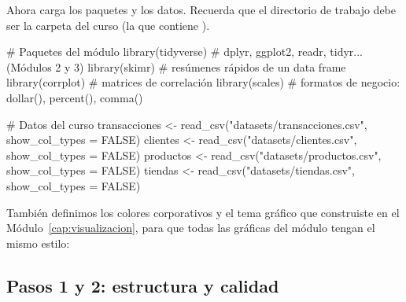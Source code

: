 Ahora carga los paquetes y los datos. Recuerda que el directorio de trabajo
debe ser la carpeta del curso (la que contiene ).

\begin{rcode}
# Paquetes del módulo
library(tidyverse)   # dplyr, ggplot2, readr, tidyr... (Módulos 2 y 3)
library(skimr)       # resúmenes rápidos de un data frame
library(corrplot)    # matrices de correlación
library(scales)      # formatos de negocio: dollar(), percent(), comma()

# Datos del curso
transacciones <- read_csv("datasets/transacciones.csv",
                          show_col_types = FALSE)
clientes  <- read_csv("datasets/clientes.csv", show_col_types = FALSE)
productos <- read_csv("datasets/productos.csv", show_col_types = FALSE)
tiendas   <- read_csv("datasets/tiendas.csv", show_col_types = FALSE)
\end{rcode}

También definimos los colores corporativos y el tema gráfico que construiste
en el Módulo~\ref{cap:visualizacion}, para que todas las gráficas del módulo
tengan el mismo estilo:


\subsection{Pasos 1 y 2: estructura y calidad}


